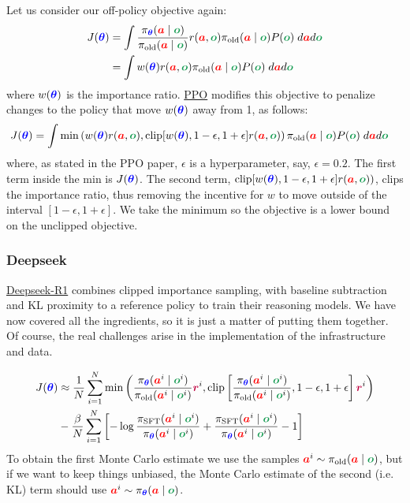 \documentclass{article}
\newcommand{\colsym}[2]{\ensuremath{\textcolor{#1}{\boldsymbol{#2}}}}
\newcommand{\action}{\colsym{red}{a}}
\newcommand{\obs}{\colsym{ForestGreen}{o}}
\newcommand{\reward}{\colsym{purple}{r}}
\newcommand{\params}{\colsym{blue}{\theta}}
\begin{document}
Let us consider our off-policy objective again:
\begin{align*}
 J(\params)
&= \int \frac{\pi_{\params}(\action \mid \obs)}{\pi_{\text{old}}(\action \mid \obs)} r(\action, \obs) \pi_{\text{old}}(\action \mid \obs) P(\obs) \; d\action d\obs
\\
&= \int w(\params) r(\action, \obs)  \pi_{\text{old}}(\action \mid \obs) P(\obs) \; d\action d\obs
\end{align*}
where $w(\params)$ is the importance ratio.
\href{https://arxiv.org/abs/1707.06347}{PPO} modifies this objective to penalize changes to the policy that move $w(\params)$ away from 1, as follows:
\begin{align*}
J(\params) &= \int \min\left(w(\params)  r(\action, \obs), \text{clip}[w(\params), 1 - \epsilon, 1 + \epsilon]  r(\action, \obs)\right)
\pi_{\text{old}}(\action \mid \obs) P(\obs) \; d\action d\obs
\end{align*}
where, as stated in the PPO paper, $\epsilon$ is a hyperparameter, say, $\epsilon = 0.2$. The first term inside the min is $J(\params)$. The second term, $ \text{clip}[w(\params), 1 - \epsilon, 1 + \epsilon]  r(\action, \obs))$, clips the importance ratio, thus removing the incentive for $w$ to move outside of the interval $[1 - \epsilon, 1 + \epsilon]$. We take the minimum so the objective is a lower bound on the unclipped objective.

\subsubsection{Deepseek}

\href{https://arxiv.org/abs/2501.12948}{Deepseek-R1} combines clipped importance sampling, with baseline subtraction and KL proximity to a reference policy to train their reasoning models. We have now covered all the ingredients, so it is just a matter of putting them together. Of course, the real challenges arise in the implementation of the infrastructure and data.

\begin{align*}
J(\params) &\approx \frac{1}{N} \sum_{i=1}^{N} \min\left(\frac{\pi_{\params}(\action^i \mid \obs^i)}{\pi_{\text{old}}(\action^i \mid \obs^i)}  \reward^i, \text{clip}\left[\frac{\pi_{\params}(\action^i \mid \obs^i)}{\pi_{\text{old}}(\action^i \mid \obs^i)}, 1 - \epsilon, 1 + \epsilon\right]  \reward^i \right)\\
& - \frac{\beta}{N} \sum_{i=1}^N \left[ - \log \frac{\pi_{\text{SFT}}(\action^i \mid \obs^i)}{\pi_{\params}(\action^i \mid \obs^i)} + \frac{\pi_{\text{SFT}}(\action^i \mid \obs^i)}{\pi_{\params}(\action^i \mid \obs^i)} - 1 \right]
\end{align*}
To obtain the first Monte Carlo estimate we use the samples $\action^i \sim \pi_{\text{old}}(\action \mid \obs)$, but if we want to keep things unbiased, the Monte Carlo estimate of the second (i.e. KL) term should use
$\action^i \sim \pi_{\params}(\action \mid \obs)$.
\end{document}
